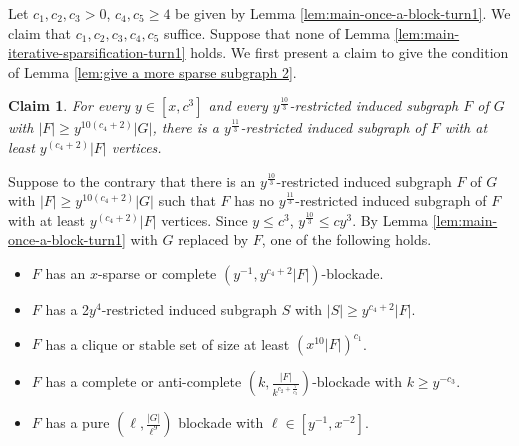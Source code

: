 \documentclass[a4paper,11pt]{article}
\newtheorem{claim}{Claim}[theorem]
\let\oldendproof\endproof
\renewenvironment{proof}[1][\proofname]{%
	\oldproof[\normalfont\bfseries #1]%
}{\oldendproof}
\renewcommand{\qedsymbol}{$\square$}%
\newenvironment{subproof}[1][\normalfont\it Subproof]{%
	\renewcommand{\qedsymbol}{{\tiny{$\blacksquare$}}}%
	\begin{proof}[#1]%
	}{%
	\end{proof}%
}
\begin{document}
    \begin{proof}
        Let $c_1,c_2,c_3>0$, $c_4,c_5\geq 4$ be given by Lemma \ref{lem:main-once-a-block-turn1}. 
        We claim that $c_1,c_2,c_3,c_4,c_5$ suffice. 
        Suppose that none of Lemma \ref{lem:main-iterative-sparsification-turn1} holds. 
        We first present a claim to give the condition of Lemma \ref{lem:give a more sparse subgraph 2}. 
        
        \begin{claim}\label{clm:condition of lemma-give a more sparse subgraph 2}
            For every $y\in[x,c^{3}]$ and every $y^{\frac{10}{3}}$-restricted induced subgraph $F$ of $G$ with $|F|\geq y^{10(c_4+2)}|G|$, there is a $y^{\frac{11}{3}}$-restricted induced subgraph of $F$ with at least $y^{(c_4+2)}|F|$ vertices.
        \end{claim}
        
        \begin{subproof}[Proof of Claim \ref{clm:condition of lemma-give a more sparse subgraph 2}]
            Suppose to the contrary that there is an $y^{\frac{10}{3}}$-restricted induced subgraph $F$ of $G$ with $|F|\geq y^{10(c_4+2)}|G|$ such that $F$ has no $y^{\frac{11}{3}}$-restricted induced subgraph of $F$ with at least $y^{(c_4+2)}|F|$ vertices. 
            Since $y\leq c^3$, $y^{\frac{10}{3}}\leq cy^3$. 
            By Lemma \ref{lem:main-once-a-block-turn1} with $G$ replaced by $F$, one of the following holds.
            \begin{itemize}
                \item $F$ has an $x$-sparse or complete $(y^{-1},y^{c_4+2}|F|)$-blockade. 
            
                \item $F$ has a 2$y^{4}$-restricted induced subgraph $S$ with $|S|\geq y^{c_4+2}|F|$.
            
                \item $F$ has a clique or stable set of size at least $(x^{10}|F|)^{c_1}$.
            
                \item $F$ has a complete or anti-complete $(k,\frac{|F|}{k^{c_2+\frac{7}{c_3}}})$-blockade with $k\geq y^{-c_3}$.
            
                \item $F$ has a pure $(\ell,\frac{|G|}{\ell^{9}})$ blockade with $\ell\in[y^{-1}, x^{-2}]$.
            \end{itemize}
            

\end{subproof}
\end{proof}
\end{document}
